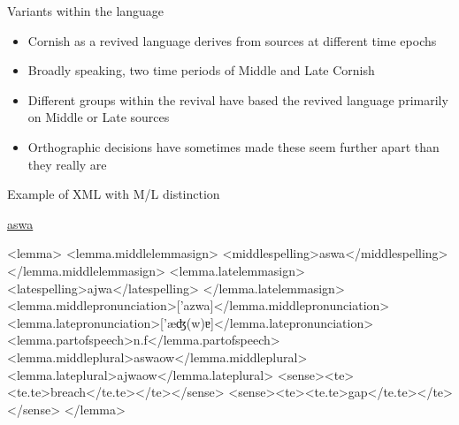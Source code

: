 \documentclass{beamer}
\begin{document}
\begin{frame}{Variants within the language}
\begin{itemize}
\item<1-> Cornish as a revived language derives from sources at different time epochs
\item<2-> Broadly speaking, two time periods of Middle and Late Cornish
\item<3-> Different groups within the revival have based the revived language primarily on Middle or Late sources
\item<4-> Orthographic decisions have sometimes made these seem further apart than they really are
\end{itemize}
\end{frame}
\begin{frame}[fragile]{Example of XML with M/L distinction}
\begin{scriptsize}
\href{http://www.cornishdictionary.org.uk/?locale=en#aswa}{aswa}
\begin{semiverbatim}
\color{gray}
<lemma>
<lemma.middlelemmasign>
<middlespelling>{\color{black}aswa}</middlespelling>
</lemma.middlelemmasign>
<lemma.latelemmasign>
<latespelling>{\color{black}ajwa}</latespelling>
</lemma.latelemmasign>
<lemma.middlepronunciation>['azwa]</lemma.middlepronunciation>
<lemma.latepronunciation>['æʤ(w)ɐ]</lemma.latepronunciation>
<lemma.partofspeech>{\color{black}n.f}</lemma.partofspeech>
<lemma.middleplural>{\color{black}aswaow}</lemma.middleplural>
<lemma.lateplural>{\color{black}ajwaow}</lemma.lateplural>
<sense><te><te.te>{\color{black}breach}</te.te></te></sense>
<sense><te><te.te>{\color{black}gap}</te.te></te></sense>
</lemma>
\end{semiverbatim}
\end{scriptsize}
\end{frame}
\end{document}
